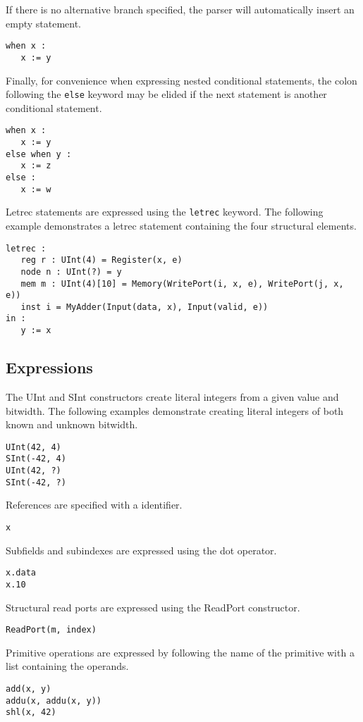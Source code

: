 \documentclass[12pt]{article}
\begin{document}
If there is no alternative branch specified, the parser will automatically insert an empty statement.
\begin{verbatim}
when x :
   x := y
\end{verbatim}

Finally, for convenience when expressing nested conditional statements, the colon following the \verb|else| keyword may be elided if the next statement is another conditional statement.
\begin{verbatim}
when x :
   x := y
else when y :
   x := z
else :
   x := w
\end{verbatim}

Letrec statements are expressed using the \verb|letrec| keyword. The following example demonstrates a letrec statement containing the four structural elements.
\begin{verbatim}
letrec :
   reg r : UInt(4) = Register(x, e)
   node n : UInt(?) = y
   mem m : UInt(4)[10] = Memory(WritePort(i, x, e), WritePort(j, x, e))
   inst i = MyAdder(Input(data, x), Input(valid, e))
in :
   y := x
\end{verbatim}

\subsection*{Expressions}

The UInt and SInt constructors create literal integers from a given value and bitwidth. The following examples demonstrate creating literal integers of both known and unknown bitwidth.
\begin{verbatim}
UInt(42, 4)
SInt(-42, 4)
UInt(42, ?)
SInt(-42, ?)
\end{verbatim}

References are specified with a identifier.
\begin{verbatim}
x
\end{verbatim}

Subfields and subindexes are expressed using the dot operator.
\begin{verbatim}
x.data
x.10
\end{verbatim}

Structural read ports are expressed using the ReadPort constructor.
\begin{verbatim}
ReadPort(m, index)
\end{verbatim}

Primitive operations are expressed by following the name of the primitive with a list containing the operands. 
\begin{verbatim}
add(x, y)
addu(x, addu(x, y))
shl(x, 42)
\end{verbatim}
\end{document}

